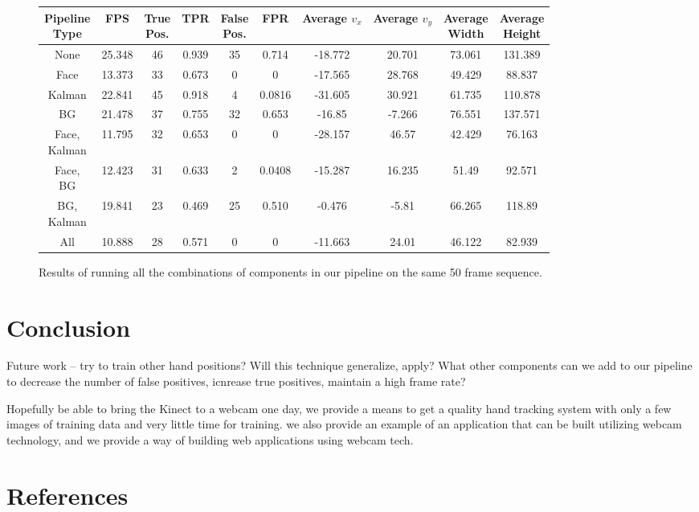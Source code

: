 \documentclass[12pt]{article}
\begin{document}
\noindent
\begin{figure}[H]
\begin{center}
\begin{tabular}{|c|c|c|c|c|c|c|c|c|c|}
\hline
\shortstack{Pipeline \\ Type} &		FPS &	\shortstack{True \\ Pos.} &	TPR &		\shortstack{False \\ Pos. }&	 FPR &		\shortstack{Average \\ $v_x$} & 	\shortstack{Average \\ $v_y$} & 	\shortstack{Average \\ Width} &	\shortstack{Average \\Height} \\	\hline \hline
None    & 	25.348	  & 	46		        &	0.939     &		35                        &	0.714     &		-18.772 &	20.701 &	73.061 &	131.389	\\ \hline
Face &	13.373 &	33 &	0.673 &	0 &	0 &	-17.565 &	28.768	& 49.429	& 88.837 \\ \hline
Kalman &	22.841 &	45	&0.918	&4	&0.0816&	-31.605	&30.921	&61.735&	110.878		\\ \hline
BG	 & 21.478&	37	&0.755	&32	&0.653	&-16.85	&-7.266	&76.551	&137.571		\\ \hline
\shortstack{Face, \\ Kalman}	&11.795&	32	&0.653&	0	&0&	-28.157	&46.57	&42.429&	76.163	\\ \hline
\shortstack{Face, \\ BG}	&12.423&	31	&0.633&	2	&0.0408&	-15.287&	16.235&	51.49&	92.571		\\ \hline
\shortstack{BG, \\ Kalman}&	19.841&	23&	0.469	&25	&0.510	&-0.476	&-5.81	&66.265&	118.89	\\ \hline
All	&10.888&	28	&0.571&	0	&0	&-11.663&	24.01&	46.122	&82.939 \\
\hline
\end{tabular}
\end{center}
\caption{Results of running all the combinations of components in our pipeline on the same 50 frame sequence.}
\label{datatable}
\end{figure}


\section{Conclusion}

Future work -- try to train other hand positions? Will this technique generalize, apply? What other components can we add to our pipeline to decrease the number of false positives, icnrease true positives, maintain a high frame rate? 

Hopefully be able to bring the Kinect to a webcam one day, we provide a means to get a quality hand tracking system with only a few images of training data and very little time for training. we also provide an example of an application that can be built utilizing webcam technology, and we provide a way of building web applications using webcam tech.

\section{References}
\end{document}
